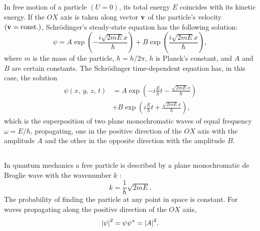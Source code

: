 \subsection{}\label{38.3.1} In free motion of a particle $(U = 0)$, its total energy $E$ coincides with its kinetic energy. If the $OX$ axis is taken along vector $\vb{v}$ of the particle's velocity $(\vb{v} = \text{const.})$, Schr\"odinger's steady-state equation  has the following solution:
\begin{equation*}%
\psi = A \exp \left(- \frac{i \sqrt{2mE} x}{\hbar} \right) + B \exp \left(\frac{i \sqrt{2mE} x}{\hbar} \right),
\end{equation*}
where $m$ is the mass of the particle, $\hbar = h/2\pi$, $h$ is Planck's constant, and $A$ and $B$ are certain constants. The Schr\"odinger time-dependent equation  has, in this case, the solution
\begin{equation*}%
\begin{split}
\psi(x,\, y,\, z,\, t) & = A \exp \left(-i \frac{E}{h}t -\frac{\sqrt{2mE} x}{\hbar} \right) \\
& + B \exp \left( i\frac{E}{h}t +\frac{\sqrt{2mE} x}{\hbar} \right),
\end{split}
\end{equation*}
which is the superposition of two plane monochromatic waves
 of equal frequency $\omega = E/\hbar$, propagating, one in the positive direction of the $OX$ axis with the amplitude $A$ and the other in the opposite direction with the amplitude $B$.

\subsection{}\label{38.3.2} In quantum mechanics a free particle is described by a plane monochromatic de Broglie wave with the wavenumber $k$ :
\begin{equation*}%
k = \frac{1}{\hbar} \sqrt{2mE}.
\end{equation*}
The probability of finding the particle at any point in space is constant. For waves propagating along the positive direction of the $OX$ axis,
\begin{equation*}%
\abs{\psi}^{2} =  \psi \psi^{*} = \abs{A}^{2}.
\end{equation*}

